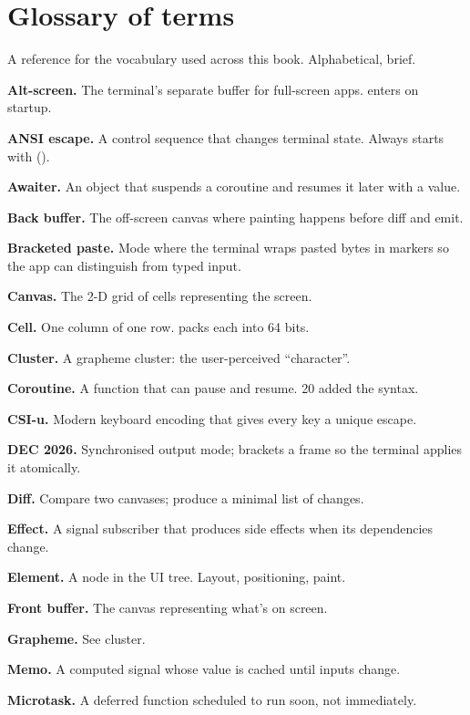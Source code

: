 \chapter{Glossary of terms}
\label{ch:glossary2}

\begin{aside}
A reference for the vocabulary used across this book.
Alphabetical, brief.
\end{aside}

\textbf{Alt-screen.} The terminal's separate buffer for
full-screen apps. \maya{} enters on startup.

\textbf{ANSI escape.} A control sequence that changes
terminal state. Always starts with  ().

\textbf{Awaiter.} An object that suspends a coroutine and
resumes it later with a value.

\textbf{Back buffer.} The off-screen canvas where painting
happens before diff and emit.

\textbf{Bracketed paste.} Mode where the terminal wraps
pasted bytes in markers so the app can distinguish from
typed input.

\textbf{Canvas.} The 2-D grid of cells representing the
screen.

\textbf{Cell.} One column of one row. \maya{} packs each
into 64 bits.

\textbf{Cluster.} A grapheme cluster: the user-perceived
``character''.

\textbf{Coroutine.} A function that can pause and resume.
\cpp{}20 added the syntax.

\textbf{CSI-u.} Modern keyboard encoding that gives every
key a unique escape.

\textbf{DEC 2026.} Synchronised output mode; brackets a
frame so the terminal applies it atomically.

\textbf{Diff.} Compare two canvases; produce a minimal
list of changes.

\textbf{Effect.} A signal subscriber that produces side
effects when its dependencies change.

\textbf{Element.} A node in the UI tree. Layout,
positioning, paint.

\textbf{Front buffer.} The canvas representing what's on
screen.

\textbf{Grapheme.} See cluster.

\textbf{Memo.} A computed signal whose value is cached
until inputs change.

\textbf{Microtask.} A deferred function scheduled to run
soon, not immediately.

